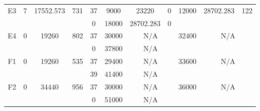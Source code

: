 \begin{sidewaystable}
\begin{tabular}{c||c|c|c||c|c|c|c||c|c|c}
         &
        
      \\
      \hline
      \multirow{2}{*}{E3} &
      \multirow{2}{*}{7} &
      \multirow{2}{*}{17552.573} &
      \multirow{2}{*}{731} &
      37 &
      9000 &
        23220 &
        0 &
      \multirow{2}{*}{12000} &
        \multirow{2}{*}{28702.283} &
        \multirow{2}{*}{122}
      \\
      \cline{5-8}
       &
       &
       &
       &
      0 &
      18000 &
        28702.283 &
        0 &
      
         &
        
      \\
      \hline
      \multirow{2}{*}{E4} &
      \multirow{2}{*}{0} &
      \multirow{2}{*}{19260} &
      \multirow{2}{*}{802} &
      37 &
      30000 &
        \multicolumn{2}{|c||}{N/A} &
      \multirow{2}{*}{32400} &
        \multicolumn{2}{c}{\multirow{2}{*}{N/A}}
      \\
      \cline{5-8}
       &
       &
       &
       &
      0 &
      37800 &
        \multicolumn{2}{|c||}{N/A} &
      
        
      \\
      \hline
      \multirow{2}{*}{F1} &
      \multirow{2}{*}{0} &
      \multirow{2}{*}{19260} &
      \multirow{2}{*}{535} &
      37 &
      29400 &
        \multicolumn{2}{|c||}{N/A} &
      \multirow{2}{*}{33600} &
        \multicolumn{2}{c}{\multirow{2}{*}{N/A}}
      \\
      \cline{5-8}
       &
       &
       &
       &
      39 &
      41400 &
        \multicolumn{2}{|c||}{N/A} &
      
        
      \\
      \hline
      \multirow{2}{*}{F2} &
      \multirow{2}{*}{0} &
      \multirow{2}{*}{34440} &
      \multirow{2}{*}{956} &
      37 &
      30000 &
        \multicolumn{2}{|c||}{N/A} &
      \multirow{2}{*}{36000} &
        \multicolumn{2}{c}{\multirow{2}{*}{N/A}}
      \\
      \cline{5-8}
       &
       &
       &
       &
      0 &
      51000 &
        \multicolumn{2}{|c||}{N/A} &
      
        
      \\
\end{tabular}
\label{table:RASDATASET2} 
\end{sidewaystable}